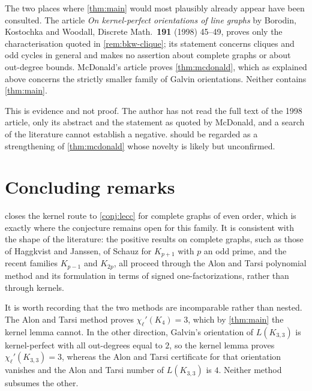 \documentclass[11pt]{article}
\numberwithin{equation}{section}
\theoremstyle{plain}
\newcommand{\chpl}{\chi_{\ell}'}
\newcommand{\LG}{L}
\begin{document}
\begin{remark}\label{rem:status}
The two places where \cref{thm:main} would most plausibly already appear have been consulted.
The article \emph{On kernel-perfect orientations of line graphs} by Borodin, Kostochka and
Woodall, Discrete Math.\ \textbf{191} (1998) 45--49, proves only the characterisation quoted in
\cref{rem:bkw-clique}; its statement concerns cliques and odd cycles in general and makes no
assertion about complete graphs or about out-degree bounds. McDonald's article proves
\cref{thm:mcdonald}, which as explained above concerns the strictly smaller family of Galvin
orientations. Neither contains \cref{thm:main}.

This is evidence and not proof. The author has not read the full text of the 1998 article,
only its abstract and the statement as quoted by McDonald, and a search of the literature
cannot establish a negative.  should be regarded as a strengthening of
\cref{thm:mcdonald} whose novelty is likely but unconfirmed.
\end{remark}

\section{Concluding remarks}

 closes the kernel route to \cref{conj:lecc} for complete graphs of even order,
which is exactly where the conjecture remains open for this family. It is consistent with the
shape of the literature: the positive results on complete graphs, such as those of Haggkvist
and Janssen, of Schauz for $K_{p+1}$ with $p$ an odd prime, and the recent families
$K_{p-1}$ and $K_{2p}$, all proceed through the Alon and Tarsi polynomial method and its
formulation in terms of signed one-factorizations, rather than through kernels.

It is worth recording that the two methods are incomparable rather than nested. The Alon and
Tarsi method proves $\chpl(K_4)=3$, which by \cref{thm:main} the kernel lemma cannot. In the
other direction, Galvin's orientation of $\LG(K_{3,3})$ is kernel-perfect with all out-degrees
equal to $2$, so the kernel lemma proves $\chpl(K_{3,3})=3$, whereas the Alon and Tarsi
certificate for that orientation vanishes and the Alon and Tarsi number of $\LG(K_{3,3})$ is
$4$. Neither method subsumes the other.
\end{document}
